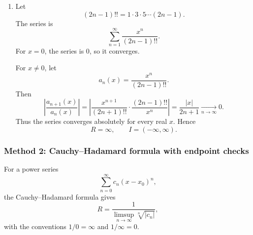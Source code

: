 \documentclass[12pt]{article}
\begin{document}
\begin{enumerate}[label=(\alph*)]
At \(x=a+\frac1b\),
\[
\frac{b^n}{\ln n}\left(\frac1b\right)^n
=
\frac1{\ln n}.
\]
Thus the endpoint series is
\[
\sum_{n=2}^{\infty}\frac1{\ln n}.
\]
For all sufficiently large \(n\),
\[
\ln n<\sqrt n,
\]
so
\[
\frac1{\ln n}>\frac1{\sqrt n}.
\]
Since
\[
\sum_{n=2}^{\infty}\frac1{\sqrt n}
\]
diverges, the comparison test gives
\[
\sum_{n=2}^{\infty}\frac1{\ln n}
\]
divergent.

At \(x=a-\frac1b\),
\[
\frac{b^n}{\ln n}\left(-\frac1b\right)^n
=
\frac{(-1)^n}{\ln n}.
\]
The sequence \(\frac1{\ln n}\) decreases to \(0\) for \(n\ge3\), so
\[
\sum_{n=2}^{\infty}\frac{(-1)^n}{\ln n}
\]
converges by the Alternating Series Test.

Therefore
\[
\boxed{R=\frac1b,\qquad I=\left[a-\frac1b,\ a+\frac1b\right)}.
\]

\item Let
\[
(2n-1)!!=1\cdot3\cdot5\cdots(2n-1).
\]
The series is
\[
\sum_{n=1}^{\infty}\frac{x^n}{(2n-1)!!}.
\]
For \(x=0\), the series is \(0\), so it converges.

For \(x\ne0\), let
\[
a_n(x)=\frac{x^n}{(2n-1)!!}.
\]
Then
\[
\left|\frac{a_{n+1}(x)}{a_n(x)}\right|
=
\left|\frac{x^{n+1}}{(2n+1)!!}\cdot\frac{(2n-1)!!}{x^n}\right|
=
\frac{|x|}{2n+1}
\xrightarrow[n\to\infty]{}
0.
\]
Thus the series converges absolutely for every real \(x\). Hence
\[
\boxed{R=\infty,\qquad I=(-\infty,\infty)}.
\]
\end{enumerate}

\newpage
\subsubsection*{Method 2: Cauchy--Hadamard formula with endpoint checks}
For a power series
\[
\sum_{n=0}^{\infty}c_n(x-x_0)^n,
\]
the Cauchy--Hadamard formula gives
\[
R=\frac1{\limsup\limits_{n\to\infty}\sqrt[n]{|c_n|}},
\]
with the conventions \(1/0=\infty\) and \(1/\infty=0\).
\end{document}
